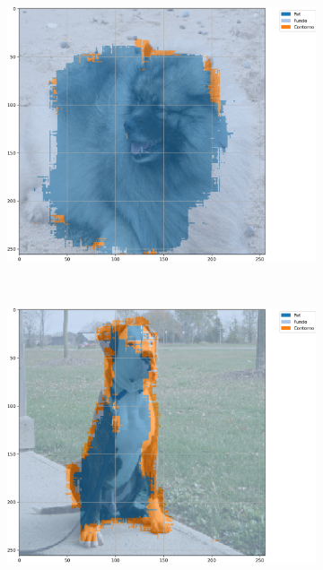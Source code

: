 \begin{figure}[H]
    \centering
    \caption{Exemplos segmentados a partir de U-Net-\textit{Like} com \textit{Max Pooling} e 20 épocas no conjunto de dados \textit{Oxford-IIIT Pets} baseada em mIoU.}
    \label{results:fig:semantic:13}
     \begin{subfigure}[t]{0.32\textwidth}
         \centering
         \includegraphics[width=1\linewidth]{recursos/imagens/results/max_miou_unetlike500_image_0_overlayed_segmentation.png}
         \label{results:fig:semantic:13.1}
     \end{subfigure}%
     ~ 
     \begin{subfigure}[t]{0.32\textwidth}
         \centering
         \includegraphics[width=1\linewidth]{recursos/imagens/results/max_miou_unetlike500_image_1_overlayed_segmentation.png}

\end{subfigure}
\end{figure}

